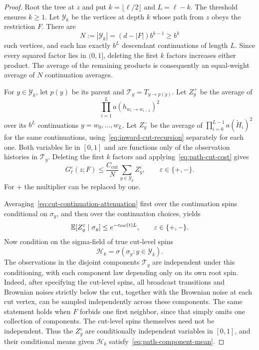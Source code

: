 \begin{proof}
Root the tree at $z$ and put $k=\lfloor\ell/2\rfloor$ and $L=\ell-k$.
The threshold ensures $k\ge1$.  Let $\mathcal Y_k$ be the vertices at
depth $k$ whose path from $z$ obeys the restriction $F$.  There are
\begin{equation}
 N:=|\mathcal Y_k|=(d-|F|)b^{k-1}\ge b^k
 \label{eq:path-level-size}
\end{equation}
such vertices, and each has exactly $b^L$ descendant continuations
of length $L$.  Since every squared factor lies in $(0,1]$, deleting
the first $k$ factors increases either product.  The average of the
remaining products is consequently an equal-weight average of $N$
continuation averages.

For $y\in\mathcal Y_k$, let $p(y)$ be its parent and
$\mathcal T_y=T_{y\to p(y)}$.  Let $Z_y^+$ be the average of
\[
 \prod_{i=1}^{L}a(h_{w_i\to w_{i-1}})^2
\]
over its $b^L$ continuations $y=w_0,\ldots,w_L$.  Let $Z_y^-$ be
the average of $\prod_{i=0}^{L-1}a(\widetilde H_i)^2$ for the same
continuations, using~\eqref{eq:inward-cut-recursion} separately for
each one.  Both variables lie in $[0,1]$ and are functions only of
the observation histories in $\mathcal T_y$.  Deleting the first
$k$ factors and applying~\eqref{eq:path-cut-cost} gives
\begin{equation}
 G^\varepsilon_\ell(z;F)
       \le\frac{C_{\mathrm{cut}}}{N}
                    \sum_{y\in\mathcal Y_k}Z_y^\varepsilon,
       \qquad \varepsilon\in\{+,-\}.
 \label{eq:path-descendant-average}
\end{equation}
For $+$ the multiplier can be replaced by one.

Averaging~\eqref{eq:cut-continuation-attenuation} first over the
continuation spins conditional on $\sigma_y$, and then over the
continuation choices, yields
\begin{equation}
 \mathbb E[Z_y^\varepsilon\mid\sigma_y]
       \le e^{-c_0\omega(t)L},\qquad\varepsilon\in\{+,-\}.
 \label{eq:path-component-mean}
\end{equation}
Now condition on the sigma-field of true cut-level spins
\[
 \mathcal H_k=\sigma(\sigma_y:y\in\mathcal Y_k).
\]
The observations in the disjoint components $\mathcal T_y$ are
independent under this conditioning, with each component law depending
only on its own root spin.  Indeed, after specifying the cut-level
spins, all broadcast transitions and Brownian noises strictly below
the cut, together with the Brownian noise at each cut vertex, can be
sampled independently across these components.  The same statement
holds when $F$ forbids one first neighbor, since that simply omits
one collection of components.  The cut-level spins themselves need
not be independent.  Thus the $Z_y^\varepsilon$ are conditionally
independent variables in $[0,1]$, and their conditional means given
$\mathcal H_k$ satisfy~\eqref{eq:path-component-mean}.


\end{proof}
